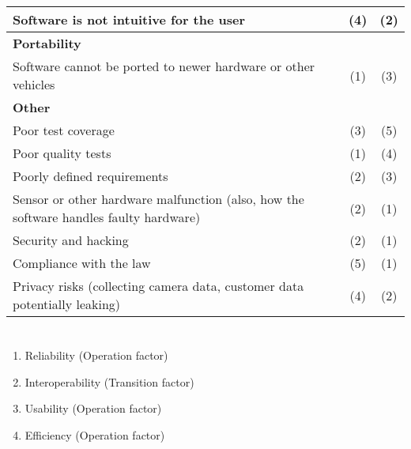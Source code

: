 \documentclass[letterpaper]{article}
\begin{document}
\begin{table}[H]
\begin{tabularx}{\textwidth}{X|c|c|}
		Software is not intuitive for the user                                                & (4)            & (2)           \\ \hline
		\textbf{Portability}                                                                  &                &               \\ \hline
		Software cannot be ported to newer hardware or other vehicles                         & (1)            & (3)           \\ \hline
		\textbf{Other}                                                                        &                &               \\ \hline
		Poor test coverage                                                                    & (3)            & (5)           \\ \hline
		Poor quality tests                                                                    & (1)            & (4)           \\ \hline
		Poorly defined requirements                                                           & (2)            & (3)           \\ \hline
		Sensor or other hardware malfunction (also, how the software handles faulty hardware) & (2)            & (1)           \\ \hline
		Security and hacking                                                                  & (2)            & (1)           \\ \hline
		Compliance with the law                                                               & (5)            & (1)           \\ \hline
		Privacy risks (collecting camera data, customer data potentially leaking)             & (4)            & (2)           \\ \hline
	\end{tabularx}
\end{table}

\section{}

\begin{enumerate}
	\item Reliability (Operation factor)
	\item Interoperability (Transition factor)
	\item Usability (Operation factor)
	\item Efficiency (Operation factor)
\end{enumerate}
\end{document}
